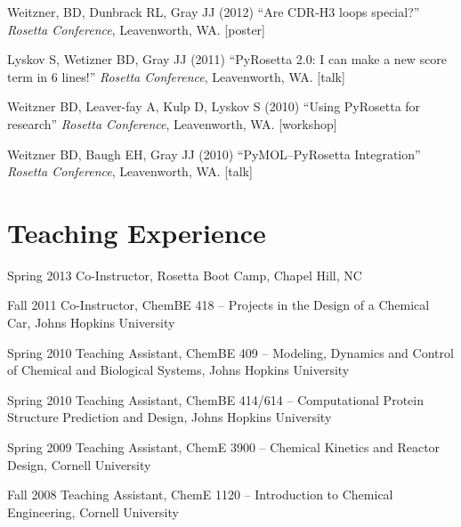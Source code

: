 \documentclass[12pt]{scrartcl}
\begin{document}
\vspace{0.75\baselineskip}

\noindent Weitzner, BD, Dunbrack RL, Gray JJ (2012) ``Are CDR-H3 loops special?'' \textit{Rosetta Conference}, Leavenworth, WA. [poster]

\vspace{0.75\baselineskip}

\noindent Lyskov S, Wetizner BD, Gray JJ (2011) ``PyRosetta 2.0: I can make a new score term in 6 lines!'' \textit{Rosetta Conference}, Leavenworth, WA. [talk]

\vspace{0.75\baselineskip}

\noindent Weitzner BD, Leaver-fay A, Kulp D,  Lyskov S (2010) ``Using PyRosetta for research'' \textit{Rosetta Conference}, Leavenworth, WA. [workshop]

\vspace{0.75\baselineskip}

\noindent Weitzner BD, Baugh EH, Gray JJ (2010) ``PyMOL--PyRosetta Integration'' \textit{Rosetta Conference}, Leavenworth, WA. [talk]

\section{\lsstyle Teaching Experience}
\begin{CV}
\item[Spring 2013] Co-Instructor, Rosetta Boot Camp, Chapel Hill, NC
\item[Fall 2011] Co-Instructor, ChemBE 418 -- Projects in the Design of a Chemical Car, Johns Hopkins University
\item[Spring 2010] Teaching Assistant, ChemBE 409 -- Modeling, Dynamics and Control of Chemical and Biological Systems, Johns Hopkins University
\item[Spring 2010] Teaching Assistant, ChemBE 414/614 -- Computational Protein Structure Prediction and Design, Johns Hopkins University
\item[Spring 2009] Teaching Assistant, ChemE 3900 -- Chemical Kinetics and Reactor Design, Cornell University
\item[Fall 2008] Teaching Assistant, ChemE 1120 -- Introduction to Chemical Engineering, Cornell University
\end{CV}
\end{document}
